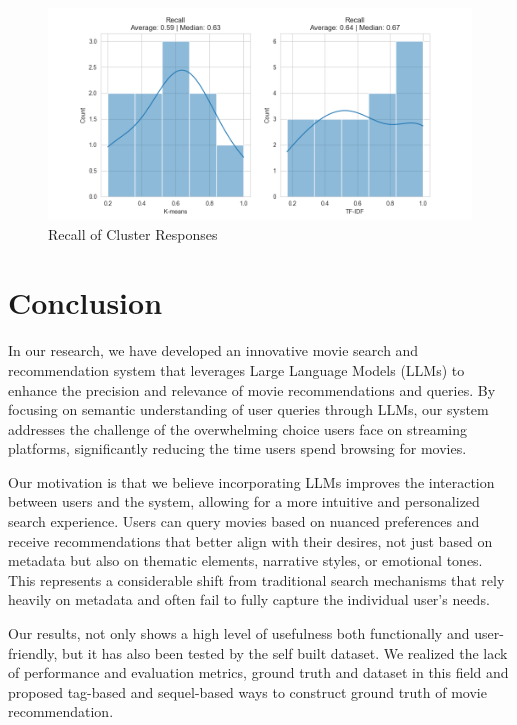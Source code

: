 \documentclass[journal]{IEEEtran}
\theoremstyle{mydefstyle}
\begin{document}
\begin{figure}
    \centering
    \includegraphics[width=1\linewidth]{doc//report//assets/recall-comparison.png}
    \caption{Recall of Cluster Responses}
    \label{fig:cluster-recall}
\end{figure}

\section{Conclusion}

In our research, we have developed an innovative movie search and recommendation system that leverages Large Language Models (LLMs) to enhance the precision and relevance of movie recommendations and queries. By focusing on semantic understanding of user queries through LLMs, our system addresses the challenge of the overwhelming choice users face on streaming platforms, significantly reducing the time users spend browsing for movies.

Our motivation is that we believe incorporating LLMs improves the interaction between users and the system, allowing for a more intuitive and personalized search experience. Users can query movies based on nuanced preferences and receive recommendations that better align with their desires, not just based on metadata but also on thematic elements, narrative styles, or emotional tones. This represents a considerable shift from traditional search mechanisms that rely heavily on metadata and often fail to fully capture the individual user's needs.

Our results, not only shows a high level of usefulness both functionally and user-friendly, but it has also been tested by the self built dataset. We realized the lack of performance and evaluation metrics, ground truth and dataset in this field and proposed tag-based and sequel-based ways to construct ground truth of movie recommendation.
\end{document}
